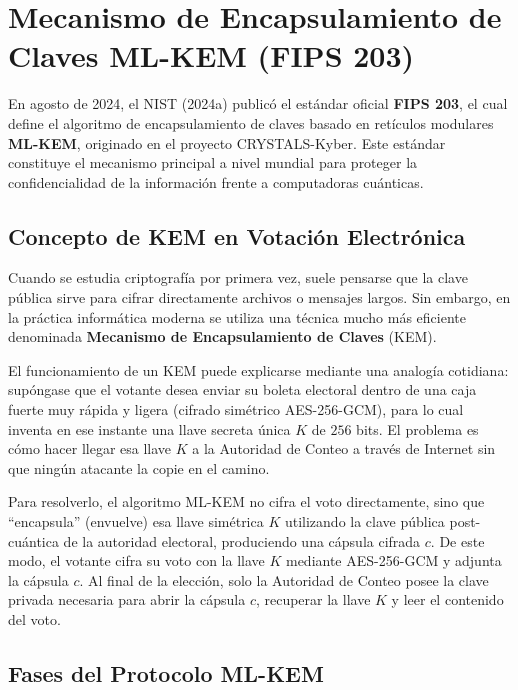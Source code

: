 \section{Mecanismo de Encapsulamiento de Claves ML-KEM (FIPS 203)}

En agosto de 2024, el NIST (2024a) publicó el estándar oficial \textbf{FIPS 203}, el cual define el algoritmo de encapsulamiento de claves basado en retículos modulares \textbf{ML-KEM}, originado en el proyecto CRYSTALS-Kyber. Este estándar constituye el mecanismo principal a nivel mundial para proteger la confidencialidad de la información frente a computadoras cuánticas.

\subsection{Concepto de KEM en Votación Electrónica}

Cuando se estudia criptografía por primera vez, suele pensarse que la clave pública sirve para cifrar directamente archivos o mensajes largos. Sin embargo, en la práctica informática moderna se utiliza una técnica mucho más eficiente denominada \textbf{Mecanismo de Encapsulamiento de Claves} (KEM).

El funcionamiento de un KEM puede explicarse mediante una analogía cotidiana: supóngase que el votante desea enviar su boleta electoral dentro de una caja fuerte muy rápida y ligera (cifrado simétrico AES-256-GCM), para lo cual inventa en ese instante una llave secreta única $K$ de $256$ bits. El problema es cómo hacer llegar esa llave $K$ a la Autoridad de Conteo a través de Internet sin que ningún atacante la copie en el camino.

Para resolverlo, el algoritmo ML-KEM no cifra el voto directamente, sino que ``encapsula'' (envuelve) esa llave simétrica $K$ utilizando la clave pública post-cuántica de la autoridad electoral, produciendo una cápsula cifrada $c$. De este modo, el votante cifra su voto con la llave $K$ mediante AES-256-GCM y adjunta la cápsula $c$. Al final de la elección, solo la Autoridad de Conteo posee la clave privada necesaria para abrir la cápsula $c$, recuperar la llave $K$ y leer el contenido del voto.

\subsection{Fases del Protocolo ML-KEM}

